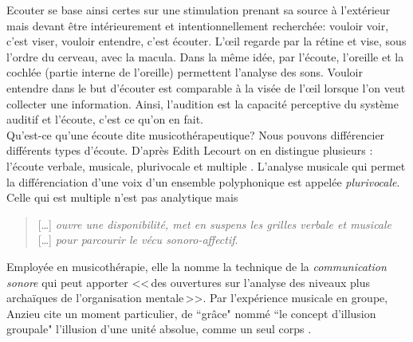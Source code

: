  
  Ecouter se base ainsi certes sur une stimulation prenant sa source à
l'extérieur mais devant être intérieurement et intentionnellement
	recherchée: vouloir voir, c'est viser, vouloir entendre, c'est
   écouter.
 L'\oe il regarde par la rétine et  vise, sous l'ordre du
  cerveau, avec la macula. Dans la même idée, par l'écoute,
  l'oreille et la cochlée (partie interne de l'oreille) permettent
  l'analyse des sons. Vouloir entendre dans le but d'écouter est comparable  à
  la visée de l'\oe il lorsque l'on veut collecter une
  information.
   Ainsi, l'audition est la capacité perceptive du système auditif et l'écoute, c'est ce qu'on en fait.
\\      
Qu'est-ce qu'une écoute dite musicothérapeutique?
Nous pouvons  différencier différents types d'écoute. D'après Edith Lecourt
on en distingue plusieurs : l'écoute verbale, musicale, plurivocale et multiple
\autocite[182]{lecourt:decouvrir}.
 L'analyse musicale qui permet la différenciation d'une voix d'un ensemble polyphonique est appelée \emph{plurivocale}. Celle qui est multiple n'est pas analytique  mais
 \begin{quote}
 	 [\ldots] \textit{ouvre une disponibilité, met en suspens les grilles verbale et musicale} [\ldots] \emph{pour parcourir le vécu sonoro-affectif}\autocite[183]{lecourt:decouvrir}.
 \end{quote}
 Employée en musicothérapie, elle la nomme la technique de la  \emph{communication sonore} qui peut apporter
 <<\,des ouvertures sur l'analyse des niveaux plus archaïques de l'organisation mentale\,>>\autocite[154]{lecourt:decouvrir}.
 Par l'expérience musicale en groupe, Anzieu cite un moment
 particulier, de ``grâce"  nommé ``le concept d'illusion groupale"
 l'illusion d'une unité absolue, comme un seul corps \autocite[113]{AnzieuMoiPeau}.
